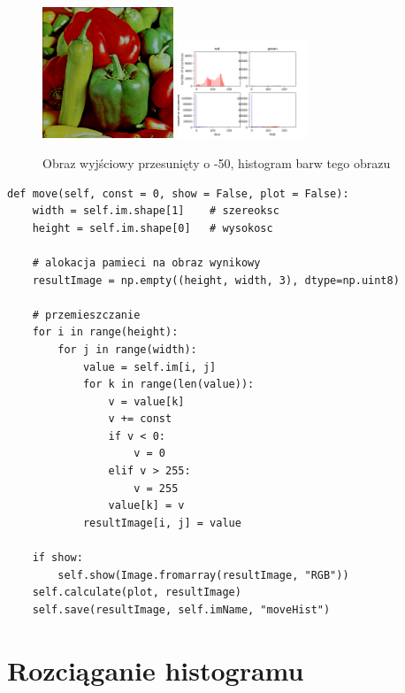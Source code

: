 \documentclass[final,a4paper,openany,12pt]{mwbk}
\begin{document}
\begin{figure}[H]
	\begin{center}
		\includegraphics[width=0.35\textwidth]{peppers_color_moveHist_result}
		\includegraphics[width=0.35\textwidth]{peppers_color_moveHist_histogram}
	\end{center}
	\caption{Obraz wyjściowy przesunięty o -50, histogram barw tego obrazu}
\end{figure}



\begin{lstlisting}[caption=Przemieszczanie histogramu]
def move(self, const = 0, show = False, plot = False):
	width = self.im.shape[1]    # szereoksc
	height = self.im.shape[0]   # wysokosc
	
	# alokacja pamieci na obraz wynikowy
	resultImage = np.empty((height, width, 3), dtype=np.uint8)
	
	# przemieszczanie
	for i in range(height):
		for j in range(width):
			value = self.im[i, j]
			for k in range(len(value)):
				v = value[k]
				v += const
				if v < 0:
					v = 0
				elif v > 255:
					v = 255
				value[k] = v
			resultImage[i, j] = value
	
	if show:
		self.show(Image.fromarray(resultImage, "RGB"))
	self.calculate(plot, resultImage)
	self.save(resultImage, self.imName, "moveHist")
\end{lstlisting}

\newpage

\section{Rozciąganie histogramu}
\end{document}
